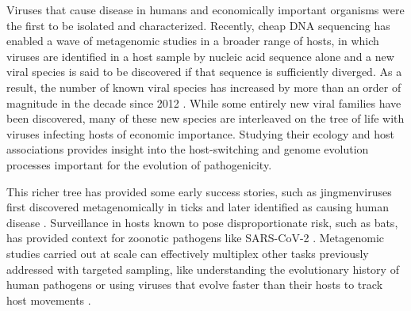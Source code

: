 \documentclass[11pt,twocolumn]{article}
\begin{document}
\twocolumn




Viruses that cause disease in humans and economically important organisms were the first to be isolated and characterized.
Recently, cheap DNA sequencing has enabled a wave of metagenomic studies in a broader range of hosts, in which viruses are identified in a host sample by nucleic acid sequence alone and a new viral species is said to be discovered if that sequence is sufficiently diverged. As a result, the number of known viral species has increased by more than an order of magnitude in the decade since 2012 \citep{roux_metagenomics_2021}.
While some entirely new viral families have been discovered, many of these new species are interleaved on the tree of life with viruses infecting hosts of economic importance. Studying their ecology \citep{shi_stable_2019} and host associations \citep{li_unprecedented_2015,shi_evolutionary_2018} provides insight into the host-switching and genome evolution processes important for the evolution of pathogenicity.


This richer tree has provided some early success stories, such as jingmenviruses first discovered metagenomically in ticks \citep{qin_tick-borne_2014} and later identified as causing human disease \citep{wang_new_2019}. Surveillance in hosts known to pose disproportionate risk, such as bats, \citep{ge_coexistence_2016} has provided context for zoonotic pathogens like SARS-CoV-2 \citep{wu_new_2020}.
Metagenomic studies carried out at scale can effectively multiplex other tasks previously addressed with targeted sampling, like understanding the evolutionary history of human pathogens \citep{keele_chimpanzee_2006} or using viruses that evolve faster than their hosts to track host movements \citep{wheeler_spatial_2010}.
\end{document}
